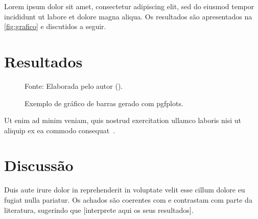 
Lorem ipsum dolor sit amet, consectetur adipiscing elit, sed do eiusmod tempor
incididunt ut labore et dolore magna aliqua. Os resultados são apresentados na
\autoref{fig:grafico} e discutidos a seguir.

\section{Resultados}
\label{sec:resultados}

\begin{figure}[!htb]
  \caption{Exemplo de gráfico de barras gerado com pgfplots.}
  \label{fig:grafico}
  \centering
  {Fonte: Elaborada pelo autor (\the\year{}).}
\end{figure}

Ut enim ad minim veniam, quis nostrud exercitation ullamco laboris nisi ut
aliquip ex ea commodo consequat~\parencite{exemplo-artigo}.

\section{Discussão}
\label{sec:discussao}

Duis aute irure dolor in reprehenderit in voluptate velit esse cillum dolore eu
fugiat nulla pariatur. Os achados são coerentes com \textcite{exemplo-livro} e
contrastam com parte da literatura, sugerindo que [interprete aqui os seus
resultados].
